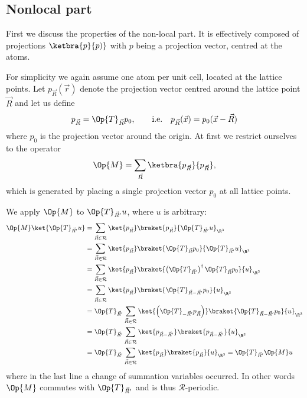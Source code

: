 \documentclass{MFHarticle}
\begin{document}
\subsection{Nonlocal part}
First we discuss the properties of the non-local part.
It is effectively composed of projections $\ketbra{p}{p)}$
with $p$ being a projection vector, centred at the atoms.

For simplicity we again assume one atom per unit cell,
located at the lattice points.
Let $p_{\vec{R}}(\vec{r})$ denote the projection vector centred
around the lattice point $\vec{R}$ and let us define
\[ p_{\vec{R}} = \Op{T}_{\vec{R}} p_0,
\qquad \text{i.e.} \quad
p_{\vec{R}}(\vec{x}) = p_0(\vec{x} - \vec{R})   \]
where $p_0$ is the projection vector around the origin.
At first we restrict ourselves to the operator
\[ \Op{M} = \sum_{\vec{R}} \ketbra{p_{\vec{R}}}{p_{\vec{R}} }, \]
which is generated by placing a single projection vector $p_0$
at all lattice points.

We apply $\Op{M}$ to $\Op{T}_{\vec{R}'} u$, where $u$ is arbitrary:
\begin{align*}
\Op{M} \ket{\Op{T}_{\vec{R}'} u}
&= \sum_{\vec{R} \in \mathcal{R}}
\ket{p_{\vec{R}}} \braket{p_{\vec{R}}}{\Op{T}_{\vec{R}'} u}_{\R^3} \\
&= \sum_{\vec{R} \in \mathcal{R}} \ket{p_{\vec{R}}}
\braket{\Op{T}_{\vec{R}} p_0}{\Op{T}_{\vec{R}'} u}_{\R^3} \\
&= \sum_{\vec{R} \in \mathcal{R}} \ket{p_{\vec{R}}}
\braket{\left( \Op{T}_{\vec{R}'} \right)^\dagger \Op{T}_{\vec{R}} p_0}{u}_{\R^3} \\
&= \sum_{\vec{R} \in \mathcal{R}} \ket{p_{\vec{R}}}
\braket{\Op{T}_{\vec{R} - \vec{R}'} p_0}{u}_{\R^3} \\
&= \Op{T}_{\vec{R}'} \sum_{\vec{R} \in \mathcal{R}}
\ket{\left(\Op{T}_{-\vec{R}'} p_{\vec{R}}\right)}
\braket{\Op{T}_{\vec{R} - \vec{R}'} p_0}{u}_{\R^3} \\
&= \Op{T}_{\vec{R}'} \sum_{\vec{R} \in \mathcal{R}}
\ket{p_{\vec{R}- \vec{R}'}} \braket{p_{\vec{R}- \vec{R}'}}{u}_{\R^3} \\
&= \Op{T}_{\vec{R}'} \sum_{\vec{R} \in \mathcal{R}}
\ket{p_{\vec{R}}} \braket{p_{\vec{R}}}{u}_{\R^3} = \Op{T}_{\vec{R}'} \Op{M} u
\end{align*}
where in the last line a change of summation variables occurred.
In other words $\Op{M}$ commutes with $\Op{T}_{\vec{R}'}$
and is thus $\mathcal{R}$-periodic.
\end{document}

